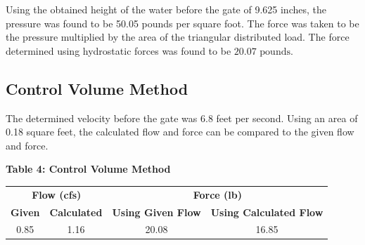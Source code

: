 \documentclass{article}
\begin{document}
\noindent Using the obtained height of the water before the gate of 9.625 inches, the pressure was found to be 50.05 pounds per square foot. The force was taken to be the pressure multiplied by the area of the triangular distributed load. The force determined using hydrostatic forces was found to be $\boxed{20.07\text{ pounds}}$. 

\subsection{Control Volume Method}
\noindent The determined velocity before the gate was 6.8 feet per second. Using an area of 0.18 square feet, the calculated flow and force can be compared to the given flow and force.

\begin{center}
    {\large{\bf Table 4: Control Volume Method\\}}
    \vspace{3mm}
    \begin{tabular}{|cc|cc|} 
    \hline
    \multicolumn{2}{|c|}{\textbf{Flow (cfs) }}    & \multicolumn{2}{c|}{\textbf{Force (lb) }}                            \\
    \textbf{Given} & \textbf{Calculated} & \textbf{Using Given Flow} & \textbf{Using Calculated Flow}  \\ 
    \hline
    0.85           & 1.16                & 20.08                     & 16.85                           \\
    \hline
    \end{tabular}
\end{center}
\newpage
\end{document}
